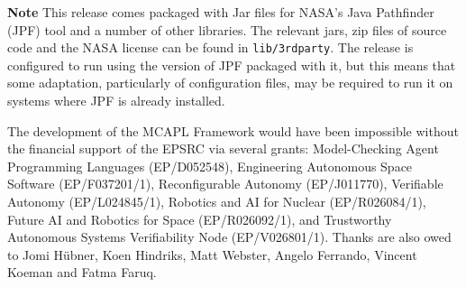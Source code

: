 {\bf Note} This release comes packaged with Jar files for NASA's Java Pathfinder (JPF) tool and a number of other libraries.  The relevant jars, zip files of source code and the NASA license can be found in \texttt{lib/3rdparty}.  The release is configured to run using the version of JPF packaged with it, but this means that some adaptation, particularly of configuration files, may be required to run it on systems where JPF is already installed.

The development of the MCAPL Framework would have been impossible without the financial support of the EPSRC via several grants: Model-Checking Agent Programming Languages (EP/D052548), Engineering Autonomous Space Software (EP/F037201/1), Reconfigurable Autonomy (EP/J011770), Verifiable Autonomy (EP/L024845/1), Robotics and AI for Nuclear (EP/R026084/1), Future AI and Robotics for Space (EP/R026092/1), and Trustworthy Autonomous Systems Verifiability Node (EP/V026801/1).  Thanks are also owed to Jomi H\"{u}bner, Koen Hindriks, Matt Webster, Angelo Ferrando, Vincent Koeman and Fatma Faruq.
